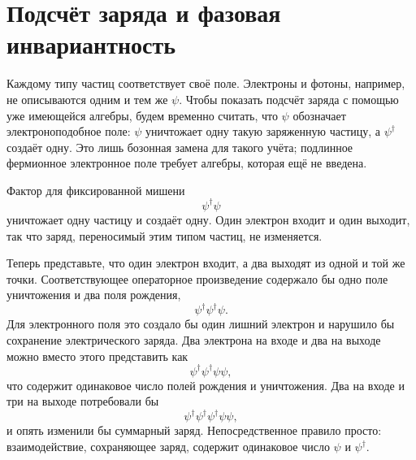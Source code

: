 \section{Подсчёт заряда и фазовая инвариантность}

Каждому типу частиц соответствует своё поле. Электроны и фотоны, например, не описываются одним и тем же \(\psi\). Чтобы показать подсчёт заряда с помощью уже имеющейся алгебры, будем временно считать, что \(\psi\) обозначает электроноподобное поле: \(\psi\) уничтожает одну такую заряженную частицу, а \(\psi^\dagger\) создаёт одну. Это лишь бозонная замена для такого учёта; подлинное фермионное электронное поле требует алгебры, которая ещё не введена.

Фактор для фиксированной мишени
\begin{equation}
\psi^\dagger\psi
\end{equation}
уничтожает одну частицу и создаёт одну. Один электрон входит и один выходит, так что заряд, переносимый этим типом частиц, не изменяется.

Теперь представьте, что один электрон входит, а два выходят из одной и той же точки. Соответствующее операторное произведение содержало бы одно поле уничтожения и два поля рождения,
\begin{equation}
\psi^\dagger\psi^\dagger\psi.
\end{equation}
Для электронного поля это создало бы один лишний электрон и нарушило бы сохранение электрического заряда. Два электрона на входе и два на выходе можно вместо этого представить как
\begin{equation}
\psi^\dagger\psi^\dagger\psi\psi,
\end{equation}
что содержит одинаковое число полей рождения и уничтожения. Два на входе и три на выходе потребовали бы
\begin{equation}
\psi^\dagger\psi^\dagger\psi^\dagger\psi\psi,
\end{equation}
и опять изменили бы суммарный заряд. Непосредственное правило просто: взаимодействие, сохраняющее заряд, содержит одинаковое число \(\psi\) и \(\psi^\dagger\).

\begin{classroomqa}
\end{classroomqa}

